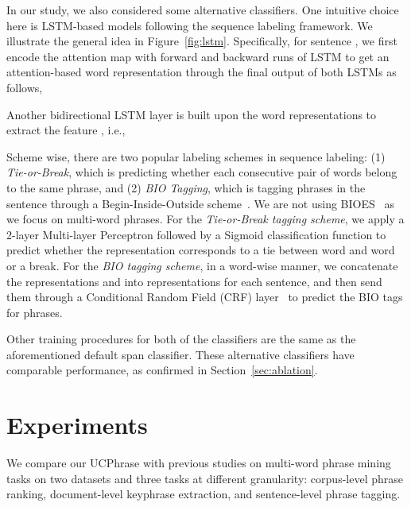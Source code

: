\documentclass[sigconf]{acmart}
\newcommand{\our}{\mbox{UCPhrase}\xspace}
\newcommand{\ie}{\mbox{i.e.}\xspace}
\newcommand{\vpar}[1]{\vspace{.2em}\noindent{\textbf{#1}}}
\begin{document}
\vpar{Alternative Classifiers.} In our study, we also considered some alternative classifiers.
One intuitive choice here is LSTM-based models following the sequence labeling framework. 
We illustrate the general idea in Figure~\ref{fig:lstm}.
Specifically, for sentence , we first encode the attention map  with forward and backward runs of LSTM to get an attention-based word representation through the final output of both LSTMs as follows,

Another bidirectional LSTM layer is built upon the word representations  to extract the feature , \ie, 


\noindent Scheme wise, there are two popular labeling schemes in sequence labeling: (1) \emph{Tie-or-Break}, which is predicting whether each consecutive pair of words belong to the same phrase, and (2) \emph{BIO Tagging}, which is tagging phrases in the sentence through a Begin-Inside-Outside scheme~\cite{ramshaw1999text}. We are not using BIOES~\cite{ratinov2009design} as we focus on multi-word phrases.
For the \emph{Tie-or-Break tagging scheme}, we apply a 2-layer Multi-layer Perceptron followed by a Sigmoid classification function to predict whether the  representation corresponds to a tie between word  and word  or a break. 
For the \emph{BIO tagging scheme}, in a word-wise manner, we concatenate the representations  and  into  representations for each sentence, and then send them through a Conditional Random Field (CRF) layer~\cite{lafferty2001conditional,huang2015bidirectional} to predict the BIO tags for phrases. 

Other training procedures for both of the classifiers are the same as the aforementioned default span classifier.
These alternative classifiers have comparable performance, as confirmed in Section~\ref{sec:ablation}.
 

\section{Experiments}

We compare our \our with previous studies on multi-word phrase mining tasks on two datasets and three tasks at different granularity: corpus-level phrase ranking, document-level keyphrase extraction, and sentence-level phrase tagging.
\end{document}
